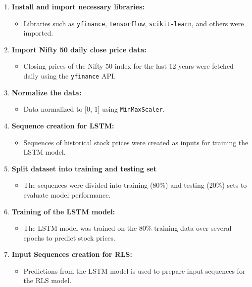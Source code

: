 \begin{enumerate}
    \item \textbf{Install and import necessary libraries:}
    \begin{itemize}
        \item Libraries such as \texttt{yfinance}, \texttt{tensorflow}, \texttt{scikit-learn}, and others were imported.
    \end{itemize}
    
    \item \textbf{Import Nifty 50 daily close price data:}
    \begin{itemize}
        \item Closing prices of the Nifty 50 index for the last 12 years were fetched daily using the \texttt{yfinance} API.
    \end{itemize}
    
    \item \textbf{Normalize the data:}
    \begin{itemize}
        \item Data normalized to [0, 1] using \texttt{MinMaxScaler}.
    \end{itemize}
    
    \item \textbf{Sequence creation for LSTM:}
    \begin{itemize}
        \item Sequences of historical stock prices were created as inputs for training the LSTM \cite{staudemeyer_understanding_2019} model.
    \end{itemize}
    
    \item \textbf{Split dataset into training and testing set}
    \begin{itemize}
        \item The sequences were divided into training (80\%) and testing (20\%) sets to evaluate model performance.
    \end{itemize}
    
    \item \textbf{Training of the LSTM model:}
    \begin{itemize}
        \item The LSTM model was trained on the 80\% training data over several epochs to predict stock prices.
    \end{itemize}
    
    \item \textbf{Input Sequences creation for RLS:}
    \begin{itemize}
        \item Predictions from the LSTM model is used to prepare input sequences for the RLS model.
    \end{itemize}
    

\end{enumerate}

